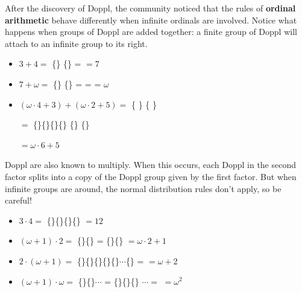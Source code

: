 \newpage

After the discovery of Doppl, the \mappMobimon{} community noticed that
the rules of \textbf{ordinal arithmetic} behave differently when infinite
ordinals are involved. Notice what happens when groups of Doppl are added
together: a finite group of Doppl will attach to an infinite group to its
right.

\begin{itemize}
\item \(3+4=\) \{\mappDoppl\mappDoppl\mappDoppl\}%
\{\mappDoppl\mappDoppl\mappDoppl\mappDoppl\} =
\mappDoppl\mappDoppl\mappDoppl\mappDoppl\mappDoppl\mappDoppl\mappDoppl{}
\(=7\)

\item \(7+\omega=\)
\{\mappDoppl\mappDoppl\mappDoppl\mappDoppl\mappDoppl\mappDoppl\mappDoppl\}%
\{\mappDopplOmega\} =
\mappDoppl\mappDoppl\mappDoppl\mappDoppl\mappDoppl\mappDoppl\mappDoppl%
\mappDopplOmega =
\mappDopplOmega{} =
\(\omega\)

\item \((\omega\cdot4+3)+(\omega\cdot2+5)=\)
\{\mappDopplOmega\mappDopplOmega\mappDopplOmega\mappDopplOmega\mappDoppl
\mappDoppl\mappDoppl\}%
\{\mappDopplOmega\mappDopplOmega\mappDoppl\mappDoppl\mappDoppl\mappDoppl
\mappDoppl\}

\hspace{1.55in} \(=\)
\{\mappDopplOmega\}\{\mappDopplOmega\}\{\mappDopplOmega\}\{\mappDopplOmega\}%
\{\mappDoppl\mappDoppl\mappDoppl\mappDopplOmega\}%
\{\mappDopplOmega\}\mappDoppl\mappDoppl\mappDoppl\mappDoppl\mappDoppl{}

\hspace{1.55in} \(=\omega\cdot6+5\)
\end{itemize}

Doppl are also known to multiply. When this occurs, each Doppl in the second
factor splits into a copy of the Doppl group given by the first factor.
But when infinite groups are around, the normal distribution rules don't apply,
so be careful!

\begin{itemize}
\item \(3\cdot 4=\)
\{\mappDoppl\mappDoppl\mappDoppl\}\{\mappDoppl\mappDoppl\mappDoppl\}\{\mappDoppl\mappDoppl\mappDoppl\}\{\mappDoppl\mappDoppl\mappDoppl\} \(=12\)

\item \((\omega+1)\cdot 2=\)
\{\mappDopplOmega\mappDoppl\}\{\mappDopplOmega\mappDoppl\} =
\{\mappDopplOmega\}\{\mappDoppl\mappDopplOmega\}\mappDoppl{} \(=\omega\cdot 2+1\)

\item \(2\cdot(\omega+1)=\)
\{\mappDoppl\mappDoppl\}\{\mappDoppl\mappDoppl\}\{\mappDoppl\mappDoppl\}\{\mappDoppl\mappDoppl\}\{\mappDoppl\mappDoppl\}\(\cdots\)\{\mappDoppl\mappDoppl\} =
\mappDopplOmega\mappDoppl\mappDoppl \(=\omega+2\)

\item \((\omega+1)\cdot \omega=\)
\{\mappDopplOmega\mappDoppl\}\{\mappDopplOmega\mappDoppl\}\(\cdots\) =
\{\mappDopplOmega\}\{\mappDoppl\mappDopplOmega\}\{\mappDoppl\mappDopplOmega\}%
\(\cdots =\)
\mappDopplOmegaSquared \(=\omega^2\)
\end{itemize}

